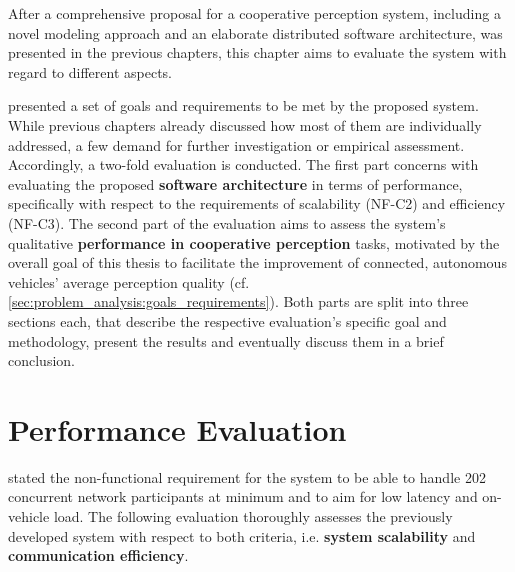 After a comprehensive proposal for a cooperative perception system, including a novel modeling approach and an elaborate distributed software architecture, was presented in the previous chapters, this chapter aims to evaluate the system with regard to different aspects.

 presented a set of goals and requirements to be met by the proposed system. While previous chapters already discussed how most of them are individually addressed, a few demand for further investigation or empirical assessment. Accordingly, a two-fold evaluation is conducted. The first part concerns with evaluating the proposed \textbf{software architecture} in terms of performance, specifically with respect to the requirements of scalability (NF-C2) and efficiency (NF-C3). The second part of the evaluation aims to assess the system's qualitative \textbf{performance in cooperative perception} tasks, motivated by the overall goal of this thesis to facilitate the improvement of connected, autonomous vehicles' average perception quality (cf. \cref{sec:problem_analysis:goals_requirements}). Both parts are split into three sections each, that describe the respective evaluation's specific goal and methodology, present the results and eventually discuss them in a brief conclusion.

\section{Performance Evaluation}
\label{sec:evaluation:performance_evaluation}
 stated the non-functional requirement for the system to be able to handle 202 concurrent network participants at minimum and to aim for low latency and on-vehicle load. The following evaluation thoroughly assesses the previously developed system with respect to both criteria, i.e. \textbf{system scalability} and \textbf{communication efficiency}.

